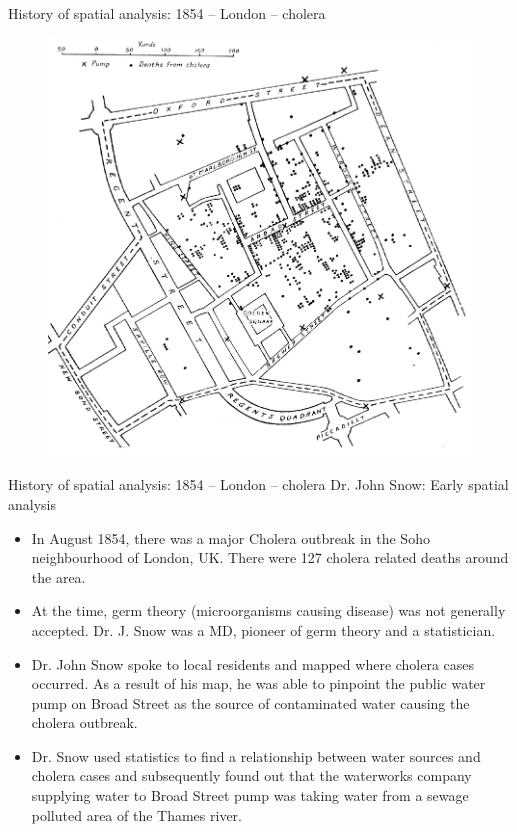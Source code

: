 \documentclass{beamer}
\begin{document}
\begin{frame}{History of spatial analysis: 1854 -- London -- cholera}
\vspace{-0.5cm}
\begin{figure}
	\includegraphics[width=.65\textwidth]{IMG/sp_cholera.eps}
\end{figure}
\end{frame}
\begin{frame}{History of spatial analysis: 1854 -- London -- cholera}
 Dr. John Snow: Early spatial analysis\\
\medskip
\begin{itemize}
    \item In August 1854, there was a major Cholera outbreak in the Soho neighbourhood of London, UK. There were 127 cholera related deaths around the area.
    \smallskip
    \item At the time, germ theory (microorganisms causing disease) was not generally accepted. Dr. J. Snow was a MD, pioneer of germ theory and a statistician.
    \smallskip
    \item Dr. John Snow spoke to local residents and mapped where cholera cases occurred. As a result of his map, he was able to pinpoint the public water pump on Broad Street as the source of contaminated water causing the cholera outbreak.
    \smallskip
    \item Dr. Snow used statistics to find a relationship between water sources and cholera cases and subsequently found out that the waterworks company supplying water to Broad Street pump was taking water from a sewage polluted area of the Thames river.
\end{itemize}
\end{frame}
\end{document}
